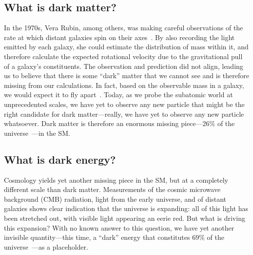 \subsection{What is dark matter?}
In the 1970s, Vera Rubin, among others, was making careful observations of the rate at which distant galaxies spin on their axes~\cite{VeraRubin}.  
By also recording the light emitted by each galaxy, she could estimate the distribution of mass within it, and therefore calculate the expected rotational velocity due to the gravitational pull of a galaxy's constituents. 
The observation and prediction did not align, leading us to believe that there is some ``dark'' matter that we cannot see and is therefore missing from our calculations. 
In fact, based on the observable mass in a galaxy, we would expect it to fly apart~\cite{GalaxyDM}. 
Today, as we probe the subatomic world at unprecedented scales, we have yet to observe any new particle that might be the right candidate for dark matter---really, we have yet to observe any new particle whatsoever. 
Dark matter is therefore an enormous missing piece---26\% of the universe~\cite{PlanckDM}---in the SM.

\subsection{What is dark energy?}
Cosmology yields yet another missing piece in the SM, but at a completely different scale than dark matter. 
Measurements of the cosmic microwave background (CMB) radiation, light from the early universe, and of distant galaxies shows clear indication that the universe is expanding: all of this light has been stretched out, with visible light appearing an eerie red. 
But what is driving this expansion? 
With no known answer to this question, we have yet another invisible quantity---this time, a ``dark'' energy that constitutes 69\% of the universe~\cite{PlanckDM}---as a placeholder.

